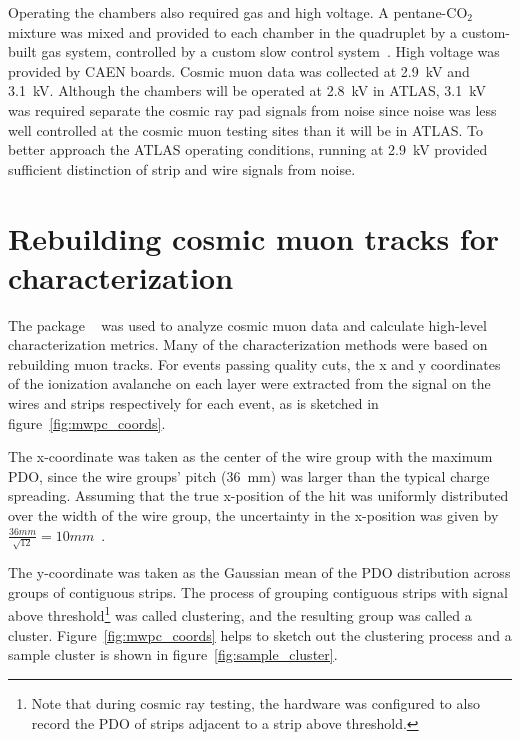 Operating the chambers also required gas and high voltage. A pentane-CO$_{2}$ mixture was mixed and provided to each chamber in the quadruplet by a custom-built gas system, controlled by a custom slow control system~\cite{keyes_development_2017}. High voltage was provided by CAEN boards. Cosmic muon data was collected at 2.9~kV and 3.1~kV. Although the chambers will be operated at 2.8~kV in ATLAS, 3.1~kV was required separate the cosmic ray pad signals from noise since noise was less well controlled at the cosmic muon testing sites than it will be in ATLAS. To better approach the ATLAS operating conditions, running at 2.9~kV provided sufficient distinction of strip and wire signals from noise.

\section{Rebuilding cosmic muon tracks for characterization}

The package ~\cite{lefebvre_tgc_analysis} was used to analyze cosmic muon data and calculate high-level characterization metrics. Many of the characterization methods were based on rebuilding muon tracks. For events passing quality cuts, the x and y coordinates of the ionization avalanche on each layer were extracted from the signal on the wires and strips respectively for each event, as is sketched in figure~\ref{fig:mwpc_coords}.

The x-coordinate was taken as the center of the wire group with the maximum PDO, since the wire groups' pitch (\SI{36}{\milli\meter}) was larger than the typical charge spreading. Assuming that the true x-position of the hit was uniformly distributed over the width of the wire group, the uncertainty in the x-position was given by $\frac{36 mm}{\sqrt{12}} = 10 mm$~\cite{Sauli:117989}.

The y-coordinate was taken as the Gaussian mean of the PDO distribution across groups of contiguous strips. The process of grouping contiguous strips with signal above threshold\footnote{Note that during cosmic ray testing, the hardware was configured to also record the PDO of strips adjacent to a strip above threshold.} was called clustering, and the resulting group was called a cluster. Figure~\ref{fig:mwpc_coords} helps to sketch out the clustering process and a sample cluster is shown in figure~\ref{fig:sample_cluster}. 

